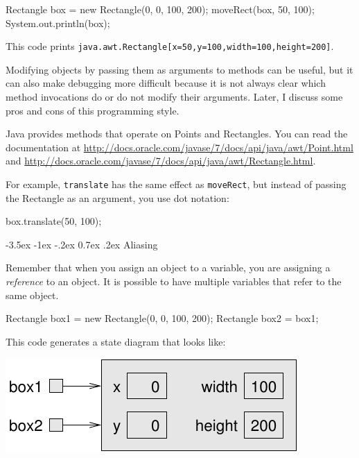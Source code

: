 \documentclass[12pt]{book}
\makeatletter
\renewcommand{\section}{\@startsection {section}{1}{\z@}%
    {-3.5ex \@plus -1ex \@minus -.2ex}%
    {0.7ex \@plus.2ex}%
    {\normalfont\Large\bfseries}}
\theoremstyle{exercise}
\newcommand{\java}[1]{\lstinline{#1}} %
\makeatother
\begin{document}
\begin{code}
    Rectangle box = new Rectangle(0, 0, 100, 200);
    moveRect(box, 50, 100);
    System.out.println(box);
\end{code}

This code prints \java{java.awt.Rectangle[x=50,y=100,width=100,height=200]}.

Modifying objects by passing them as arguments to methods can be useful, but it can also make debugging more difficult because it is not always clear which method invocations do or do not modify their arguments.
Later, I discuss some pros and cons of this programming style.

Java provides methods that operate on Points and Rectangles.
You can read the documentation at
\url{http://docs.oracle.com/javase/7/docs/api/java/awt/Point.html}
and
\url{http://docs.oracle.com/javase/7/docs/api/java/awt/Rectangle.html}.

For example, \java{translate} has the same effect as \java{moveRect}, but instead of passing the Rectangle as an argument, you use dot notation:

\begin{code}
    box.translate(50, 100);
\end{code}


\section{Aliasing}
\label{aliasing}


Remember that when you assign an object to a variable, you are assigning a {\em reference} to an object.
It is possible to have multiple variables that refer to the same object.

\begin{code}
    Rectangle box1 = new Rectangle(0, 0, 100, 200);
    Rectangle box2 = box1;
\end{code}

This code generates a state diagram that looks like:

\includegraphics{figs/aliasing.pdf}
\end{document}
